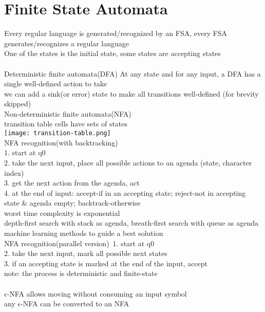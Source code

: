 \section{Finite State Automata}
{\tiny Every regular language is generated/recognized by an FSA, every FSA generates/recognizes a regular language\\
One of the states is the initial state, some states are accepting states\\
}\\
\scriptsize{Deterministic finite automata(DFA)} 
{\tiny At any state and for any input, a DFA has a single well-defined action to take\\
we can add a sink(or error) state to make all transitions well-defined (for brevity skipped)
}\\
\scriptsize{Non-deterministic finite automata(NFA)}\\ {\tiny transition table cells have sets of states\\
\texttt{[image: transition-table.png]}\\
NFA recognition(with backtracking)\\
1. start at q0\\
2. take the next input, place all possible actions to an agenda (state, character index)\\
3. get the next action from the agenda, act\\
4. at the end of input: accept-if in an accepting state; reject-not in accepting state \& agenda empty; backtrack-otherwise\\
worst time complexity is exponential\\
depth-first search with stack as agenda, breath-first search with queue as agenda\\
machine learning methods to guide a best solution\\
NFA recognition(parallel version)\
1. start at q0\\
2. take the next input, mark all possible next states\\
3. if an accepting state is marked at the end of the input, accept\\
note: the process is deterministic and finite-state\\
}\\
\scriptsize{$\epsilon$-NFA} {\tiny allows moving without consuming an input symbol\\
any $\epsilon$-NFA can be converted to an NFA\\
}\\
